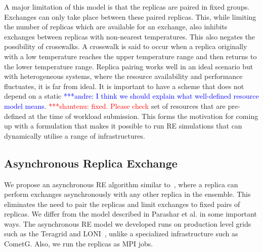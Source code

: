 \documentclass{rspublic}
\newcommand{\jhanote}[1]{ {\textcolor{red} { ***shantenu: #1 }}}
\newcommand{\alnote}[1]{ {\textcolor{blue} { ***andre: #1 }}}
\newcommand{\alnote}[1]{}
\newcommand{\jhanote}[1]{}
\begin{document}
A major limitation of this model is that the replicas are paired in fixed groups. 
Exchanges can only take place between these paired replicas.
This, while limiting the number of replicas which are available for an exchange, also inhibits exchanges between replicas with non-nearest temperatures. This also negates the possibility of crosswalks. A crosswalk is said to occur when a replica originally with a low temperature reaches the upper temperature range and then returns to the lower temperature range. %
Replica pairing works well in an ideal scenario but with heterogeneous
systems, where the resource availability and performance fluctuates,
it is far from ideal. It is important to have a scheme that does not
depend on a static \alnote{I think we should explain what well-defined
  resource model means.} \jhanote{fixed. Please check} set of
resources that are pre-defined at the time of workload submission.
This forms the motivation for coming up with a formulation that makes
it possible to run RE simulations that can dynamically utilise a range
of infrastructures.
  

  
\subsection{Asynchronous Replica Exchange}

We propose an asynchronous RE algorithm similar to~\cite{parashar_arepex},
where a replica can perform exchanges asynchronously with any other replica in the ensemble. This eliminates the need to pair the replicas and limit exchanges to fixed pairs of replicas. We differ from the model described in Parashar et al. in some important ways. The asynchronous RE model we developed runs on production level grids such as the Teragrid and LONI~\cite{LONI_web}, unlike a specialized infrastructure such as CometG. Also, we run the replicas as MPI jobs. 
\end{document}

